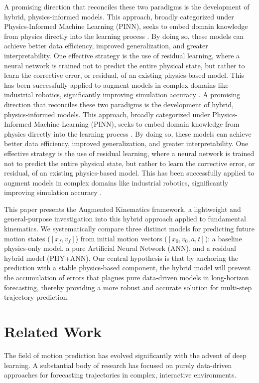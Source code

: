 \documentclass[conference]{IEEEtran}
\begin{document}
A promising direction that reconciles these two paradigms is the development of hybrid, physics-informed models. This approach, broadly categorized under Physics-Informed Machine Learning (PINN), seeks to embed domain knowledge from physics directly into the learning process \cite{b7}. By doing so, these models can achieve better data efficiency, improved generalization, and greater interpretability. One effective strategy is the use of residual learning, where a neural network is trained not to predict the entire physical state, but rather to learn the corrective error, or residual, of an existing physics-based model. This has been successfully applied to augment models in complex domains like industrial robotics, significantly improving simulation accuracy \cite{b8}.
A promising direction that reconciles these two paradigms is the development of hybrid, physics-informed models. This approach, broadly categorized under Physics-Informed Machine Learning (PINN), seeks to embed domain knowledge from physics directly into the learning process \cite{b:karniadakis_pinn, b:raissi_pinn}. By doing so, these models can achieve better data efficiency, improved generalization, and greater interpretability. One effective strategy is the use of residual learning, where a neural network is trained not to predict the entire physical state, but rather to learn the corrective error, or residual, of an existing physics-based model. This has been successfully applied to augment models in complex domains like industrial robotics, significantly improving simulation accuracy \cite{b1}.

This paper presents the Augmented Kinematics framework, a lightweight and general-purpose investigation into this hybrid approach applied to fundamental kinematics. We systematically compare three distinct models for predicting future motion states ($[x_f, v_f]$) from initial motion vectors ($[x_0, v_0, a, t]$): a baseline physics-only model, a pure Artificial Neural Network (ANN), and a residual hybrid model (PHY+ANN). Our central hypothesis is that by anchoring the prediction with a stable physics-based component, the hybrid model will prevent the accumulation of errors that plagues pure data-driven models in long-horizon forecasting, thereby providing a more robust and accurate solution for multi-step trajectory prediction.

\section{Related Work}
The field of motion prediction has evolved significantly with the advent of deep learning. A substantial body of research has focused on purely data-driven approaches for forecasting trajectories in complex, interactive environments.
\end{document}
